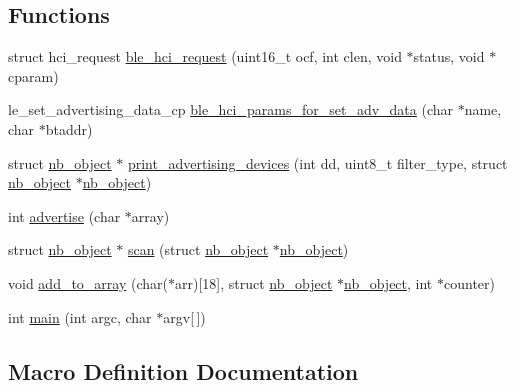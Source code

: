 \subsection*{Functions}
\begin{DoxyCompactItemize}
\item 
struct hci\+\_\+request \mbox{\hyperlink{scan-adv_8c_a1c2cdca7577ed9775b53dbee4b82c28b}{ble\+\_\+hci\+\_\+request}} (uint16\+\_\+t ocf, int clen, void $\ast$status, void $\ast$cparam)
\item 
le\+\_\+set\+\_\+advertising\+\_\+data\+\_\+cp \mbox{\hyperlink{scan-adv_8c_a220489d8e27cddcc092f9adc7eeb5540}{ble\+\_\+hci\+\_\+params\+\_\+for\+\_\+set\+\_\+adv\+\_\+data}} (char $\ast$name, char $\ast$btaddr)
\item 
struct \mbox{\hyperlink{structnb__object}{nb\+\_\+object}} $\ast$ \mbox{\hyperlink{scan-adv_8c_a9ed8193ef016bf2e85c78d6eacc2caf6}{print\+\_\+advertising\+\_\+devices}} (int dd, uint8\+\_\+t filter\+\_\+type, struct \mbox{\hyperlink{structnb__object}{nb\+\_\+object}} $\ast$\mbox{\hyperlink{structnb__object}{nb\+\_\+object}})
\item 
int \mbox{\hyperlink{scan-adv_8c_af336b7876acfc459f4ff1a871ba9aab9}{advertise}} (char $\ast$array)
\item 
struct \mbox{\hyperlink{structnb__object}{nb\+\_\+object}} $\ast$ \mbox{\hyperlink{scan-adv_8c_aa17a71c99b4021aa3c3ece883425bb24}{scan}} (struct \mbox{\hyperlink{structnb__object}{nb\+\_\+object}} $\ast$\mbox{\hyperlink{structnb__object}{nb\+\_\+object}})
\item 
void \mbox{\hyperlink{scan-adv_8c_ac44501fcb942a9c80404255067b2d1b2}{add\+\_\+to\+\_\+array}} (char($\ast$arr)\mbox{[}18\mbox{]}, struct \mbox{\hyperlink{structnb__object}{nb\+\_\+object}} $\ast$\mbox{\hyperlink{structnb__object}{nb\+\_\+object}}, int $\ast$counter)
\item 
int \mbox{\hyperlink{scan-adv_8c_a0ddf1224851353fc92bfbff6f499fa97}{main}} (int argc, char $\ast$argv\mbox{[}$\,$\mbox{]})
\end{DoxyCompactItemize}


\subsection{Macro Definition Documentation}
\mbox{\label{scan-adv_8c_ad046894fb11af9945b332bf79e643bc2}} 
